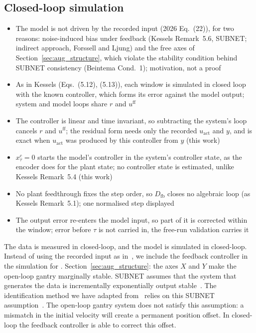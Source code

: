 \subsection{Closed-loop simulation}\label{sec:aug_loop}
\ifdraft
\begin{itemize}
\item The model is not driven by the recorded input (2026 Eq.~(22)), for two reasons: noise-induced bias under feedback (Kessels Remark~5.6, SUBNET; indirect approach, Forssell and Ljung) and the free axes of Section~\ref{sec:aug_structure}, which violate the stability condition behind SUBNET consistency (Beintema Cond.~1); motivation, not a proof
\item As in Kessels (Eqs.~(5.12), (5.13)), each window is simulated in closed loop with the known controller, which forms its error against the model output; system and model loops share $r$ and $u^{\mathrm{ff}}$
\item The controller is linear and time invariant, so subtracting the system's loop cancels $r$ and $u^{\mathrm{ff}}$; the residual form needs only the recorded $u_{\mathrm{act}}$ and $y$, and is exact when $u_{\mathrm{act}}$ was produced by this controller from $y$ (this work)
\item $x^{c}_\tau=0$ starts the model's controller in the system's controller state, as the encoder does for the plant state; no controller state is estimated, unlike Kessels Remark~5.4 (this work)
\item No plant feedthrough fixes the step order, so $D_{\mathrm{fb}}$ closes no algebraic loop (as Kessels Remark~5.1); one normalised step displayed
\item The output error re-enters the model input, so part of it is corrected within the window; error before $\tau$ is not carried in, the free-run validation carries it
\end{itemize}
\fi
{}The data is measured in closed-loop, and the model is simulated in 
closed-loop. 
Instead of using the recorded input as
in~\cite[Eq.~(22)]{hoekstra2026lfr}, we include the
feedback controller in the simulation for .
 Section~\ref{sec:aug_structure}:
the  axes $X$ and $Y$ make the open-loop gantry
marginally stable.
SUBNET assumes that the system that generates the data is
incrementally exponentially output
stable~\cite[Cond.~1]{beintema2023subnet}.
The identification method we have adapted from~\cite{hoekstra2026lfr}
relies on this SUBNET assumption~\cite[Sec.~5.5]{hoekstra2026lfr}.
The open-loop gantry system does not satisfy this assumption: 
a mismatch in the initial velocity will create a permanent position offset.
In closed-loop the feedback controller is able to correct this offset.

